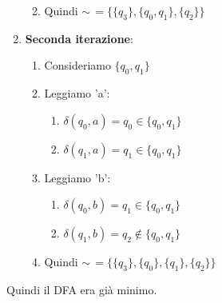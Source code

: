 \documentclass[12pt, a4paper]{report}
\begin{document}
\begin{example}
\begin{enumerate}
\begin{enumerate}
\begin{enumerate}
                            \end{enumerate}
                            \item Quindi $\sim\,=\{\{q_3\},\{q_0,q_1\},\{q_2\}\}$
                        \end{enumerate}
                        \item \textbf{Seconda iterazione}: \begin{enumerate}
                            \item Consideriamo $\{q_0,q_1\}$
                            \item Leggiamo 'a': \begin{enumerate}
                                \item $\delta(q_0,a)=q_0 \in \{q_0,q_1\}$
                                \item $\delta(q_1,a)=q_1 \in \{q_0,q_1\}$
                            \end{enumerate}
                            \item Leggiamo 'b': \begin{enumerate}
                                \item $\delta(q_0,b)=q_1 \in \{q_0,q_1\}$
                                \item $\delta(q_1,b)=q_2 \notin \{q_0,q_1\}$
                            \end{enumerate}
                            \item Quindi $\sim\,=\{\{q_3\},\{q_0\},\{q_1\},\{q_2\}\}$
                        \end{enumerate}
                    \end{enumerate}
                    Quindi il DFA era già minimo.
                \end{example}
\end{document}
